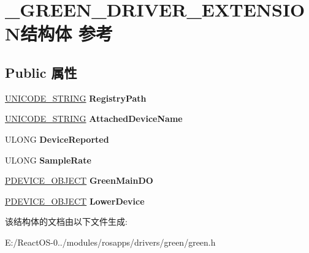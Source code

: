 \hypertarget{struct___g_r_e_e_n___d_r_i_v_e_r___e_x_t_e_n_s_i_o_n}{}\section{\+\_\+\+G\+R\+E\+E\+N\+\_\+\+D\+R\+I\+V\+E\+R\+\_\+\+E\+X\+T\+E\+N\+S\+I\+O\+N结构体 参考}
\label{struct___g_r_e_e_n___d_r_i_v_e_r___e_x_t_e_n_s_i_o_n}
\subsection*{Public 属性}
\begin{DoxyCompactItemize}
\item 
\mbox{\label{struct___g_r_e_e_n___d_r_i_v_e_r___e_x_t_e_n_s_i_o_n_a3c564cce15c8a28fa56b07ea4a9327cb}} 
\hyperlink{struct___u_n_i_c_o_d_e___s_t_r_i_n_g}{U\+N\+I\+C\+O\+D\+E\+\_\+\+S\+T\+R\+I\+NG} {\bfseries Registry\+Path}
\item 
\mbox{\label{struct___g_r_e_e_n___d_r_i_v_e_r___e_x_t_e_n_s_i_o_n_a1475037fdd0faf074e892760106d2447}} 
\hyperlink{struct___u_n_i_c_o_d_e___s_t_r_i_n_g}{U\+N\+I\+C\+O\+D\+E\+\_\+\+S\+T\+R\+I\+NG} {\bfseries Attached\+Device\+Name}
\item 
\mbox{\label{struct___g_r_e_e_n___d_r_i_v_e_r___e_x_t_e_n_s_i_o_n_a5d294e2bba38787251e996cc589a8756}} 
U\+L\+O\+NG {\bfseries Device\+Reported}
\item 
\mbox{\label{struct___g_r_e_e_n___d_r_i_v_e_r___e_x_t_e_n_s_i_o_n_a91c681f67e16b06f5640da65f65efc28}} 
U\+L\+O\+NG {\bfseries Sample\+Rate}
\item 
\mbox{\label{struct___g_r_e_e_n___d_r_i_v_e_r___e_x_t_e_n_s_i_o_n_adc2fd5b1349af70b4154538aee7aef0d}} 
\hyperlink{struct___d_e_v_i_c_e___o_b_j_e_c_t}{P\+D\+E\+V\+I\+C\+E\+\_\+\+O\+B\+J\+E\+CT} {\bfseries Green\+Main\+DO}
\item 
\mbox{\label{struct___g_r_e_e_n___d_r_i_v_e_r___e_x_t_e_n_s_i_o_n_aa57f6d955adae9d02ce118ef8fd6641e}} 
\hyperlink{struct___d_e_v_i_c_e___o_b_j_e_c_t}{P\+D\+E\+V\+I\+C\+E\+\_\+\+O\+B\+J\+E\+CT} {\bfseries Lower\+Device}
\end{DoxyCompactItemize}


该结构体的文档由以下文件生成\+:\begin{DoxyCompactItemize}
\item 
E\+:/\+React\+O\+S-\/0../modules/rosapps/drivers/green/green.\+h\end{DoxyCompactItemize}
